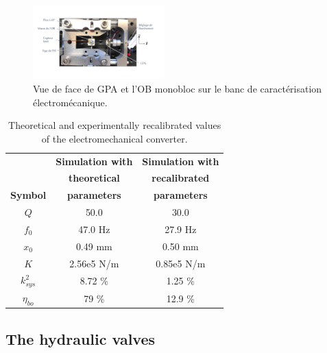 \documentclass[3p,twocolumn,preprint]{elsarticle}
\begin{document}
\lipsum[1]
\begin{figure}[!htbp]
	\centering
	\captionsetup{justification=centering}
	\includegraphics[trim={1cm 3cm 2cm 2.5cm},clip,width=0.45\textwidth]{figures/BDT_OB+GPA.pdf}
	\caption{Vue de face de GPA et l’OB monobloc sur le banc de caractérisation
	électromécanique.}
	\label{fig:BDT_OB+GPA}
\end{figure}
\begin{table}[!htbp]
\centering
\captionsetup{justification=centering}
	\begin{tabular}{ c | c | c }
	\toprule
	& \textbf{Simulation with}  	   & \textbf{Simulation with}        \\
	& \textbf{theoretical}  		   & \textbf{recalibrated }			 \\
	\multirow{-3}{*}{\textbf{Symbol}}
	& \textbf{parameters}			   & \textbf{parameters} 			 \\
	\midrule
	$Q$                       & 50.0                  & 30.0 		  	\\  
	$f_0$                     & 47.0 Hz               & 27.9 Hz  		\\
	$x_0$                     & 0.49 mm               & 0.50 mm    		\\
	$K$                       & 2.56e5 N/m            & 0.85e5 N/m 		\\
	${k^2_{sys}}$             & 8.72 \%               & 1.25 \% 		\\
	$\eta_{bo}$               & 79 \%                 & 12.9 \%   		\\
	\bottomrule
	\end{tabular}
	\caption{Theoretical and experimentally recalibrated values of the electromechanical converter.}
	\label{tab:parametres_lacher_free}
\end{table} 

	\subsection{The hydraulic valves}	
	\label{The hydraulic valves}
\end{document}
